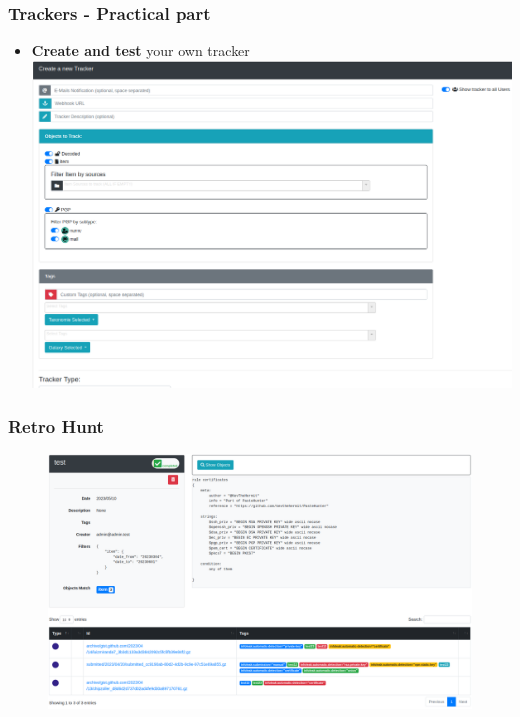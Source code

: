 \documentclass[aspectratio=169]{beamer}
\begin{document}
\begin{frame}
    \frametitle{Trackers - Practical part}
        \begin{itemize}
        	\item \textbf{Create and test} your own tracker
        	\includegraphics[scale=0.21]{screenshot/tracker_create.png}
        \end{itemize}
\end{frame}

\begin{frame}
    \frametitle{Retro Hunt}
        \begin{figure}
            \includegraphics[scale=0.22]{screenshot/retro_hunt.png}
        \end{figure}
\end{frame}
\end{document}

